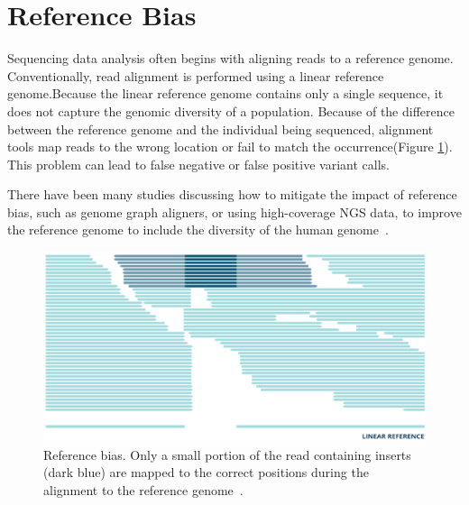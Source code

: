 \documentclass[PhD]{PHlab-thesis}
\begin{document}
\section{Reference Bias}
Sequencing data analysis often begins with aligning reads to a reference genome. Conventionally, read alignment is performed using a linear reference genome.Because the linear reference genome contains only a single sequence, it does not capture the genomic diversity of a population. Because of the difference between the reference genome and the individual being sequenced, alignment tools map reads to the wrong location or fail to match the occurrence(Figure \ref{fig:Reference bias}). This problem can lead to false negative or false positive variant calls.

There have been many studies discussing how to mitigate the impact of reference bias, such as genome graph aligners, or using high-coverage NGS data, to improve the reference genome to include the diversity of the human genome~\cite{Günther2019Refbias, Chen2021Refbias}.

\begin{figure}[h!]
	\centering
	\includegraphics[scale=0.25]{figures/Reference bias.png}
	\caption{Reference bias. Only a small portion of the read containing inserts (dark blue) are mapped to the correct positions during the alignment to the reference genome~\cite{Lau2017Refbias}.}
	\label{fig:Reference bias} %
\end{figure}
\end{document}
